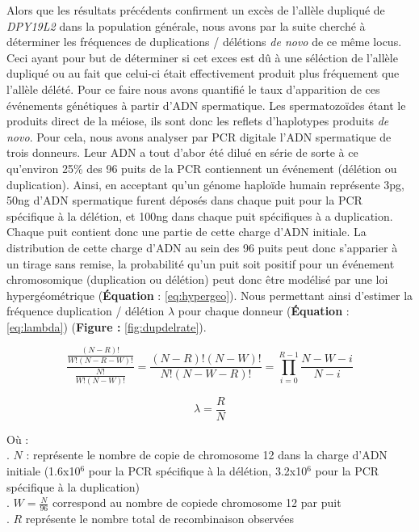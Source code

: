 \documentclass[12pt,twoside]{reedthesis}
\theoremstyle{definition}
\theoremstyle{definition}
\theoremstyle{remark}
\begin{document}
  Alors que les résultats précédents confirment un excès de l'allèle
  dupliqué de \emph{DPY19L2} dans la population générale, nous avons par
  la suite cherché à déterminer les fréquences de duplications / délétions
  \emph{de novo} de ce même locus. Ceci ayant pour but de déterminer si
  cet exces est dû à une séléction de l'allèle dupliqué ou au fait que
  celui-ci était effectivement produit plus fréquement que l'allèle
  délété. Pour ce faire nous avons quantifié le taux d'apparition de ces
  événements génétiques à partir d'ADN spermatique. Les spermatozoïdes
  étant le produits direct de la méiose, ils sont donc les reflets
  d'haplotypes produits \emph{de novo}. Pour cela, nous avons analyser par
  PCR digitale l'ADN spermatique de trois donneurs. Leur ADN a tout d'abor
  été dilué en série de sorte à ce qu'environ 25\% des 96 puits de la PCR
  contiennent un événement (délétion ou duplication). Ainsi, en acceptant
  qu'un génome haploïde humain représente 3pg, 50ng d'ADN spermatique
  furent déposés dans chaque puit pour la PCR spécifique à la délétion, et
  100ng dans chaque puit spécifiques à a duplication. Chaque puit contient
  donc une partie de cette charge d'ADN initiale. La distribution de cette
  charge d'ADN au sein des 96 puits peut donc s'apparier à un tirage sans
  remise, la probabilité qu'un puit soit positif pour un événement
  chromosomique (duplication ou délétion) peut donc être modélisé par une
  loi hypergéométrique (\textbf{Équation} : \eqref{eq:hypergeo}). Nous
  permettant ainsi d'estimer la fréquence duplication / délétion
  \(\lambda\) pour chaque donneur (\textbf{Équation} : \eqref{eq:lambda})
  (\textbf{Figure : }\ref{fig:dupdelrate}).
  
  \begin{equation} 
  \frac{\frac{(N - R)!}{W!(N-R-W)!}}{\frac{N!}{W!(N-W)!}} = \frac{(N-R)!(N-W)!}{N!(N-W-R)!} = \prod_{i=0}^{R-1}{\frac{N-W-i}{N-i}}
  \label{eq:hypergeo}
  \end{equation}
  
  \begin{equation} 
  \lambda = \frac{R}{N}
  \label{eq:lambda}
  \end{equation}
  
  Où :\\
  . \(N\) : représente le nombre de copie de chromosome 12 dans la charge
  d'ADN initiale (1.6x10\({^6}\) pour la PCR spécifique à la délétion,
  3.2x10\({^6}\) pour la PCR spécifique à la duplication)\\
  . \(W = \frac{N}{96}\) correspond au nombre de copiede chromosome 12 par
  puit\\
  . \(R\) représente le nombre total de recombinaison observées
  
\end{document}
